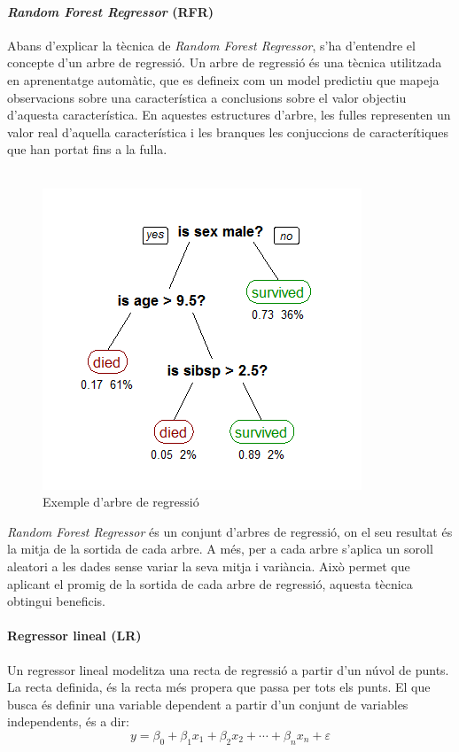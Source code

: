\documentclass[12pt,a4paper,catalan]{article}
\begin{document}
\paragraph{\textit{Random Forest Regressor} (RFR)}
Abans d'explicar la tècnica de \textit{Random Forest Regressor}, s'ha d'entendre el concepte d'un arbre de regressió. Un arbre de regressió és una tècnica utilitzada en aprenentatge automàtic, que es defineix com un model predictiu que mapeja observacions sobre una característica a conclusions sobre el valor objectiu d'aquesta característica. En aquestes estructures d'arbre, les fulles representen un valor real d'aquella característica i les branques les conjuccions de caracterítiques que han portat fins a la fulla.
\\
\\
\begin{figure}[h]
\centering
\includegraphics[width=.5\linewidth]{img/randomforest.png}
\caption{Exemple d'arbre de regressió \cite{imgrandomforestregressor}}
\end{figure}

\textit{Random Forest Regressor} \cite{randomforestregressor} és un conjunt d'arbres de regressió, on el seu resultat és la mitja de la sortida de cada arbre. A més, per a cada arbre s'aplica un soroll aleatori a les dades sense variar la seva mitja i variància. Això permet que aplicant el promig de la sortida de cada arbre de regressió, aquesta tècnica obtingui beneficis.

\newpage

\paragraph{Regressor lineal (LR)}
Un regressor lineal \cite{linearregressor} modelitza una recta de regressió a partir d'un núvol de punts. La recta definida, és la recta més propera que passa per tots els punts. El que busca és definir una variable dependent a partir d'un conjunt de variables independents, és a dir:
$$
y =\beta_0+\beta_1 x_1+\beta_2 x_2+ \cdots + \beta_n x_n + \varepsilon
$$
\end{document}

